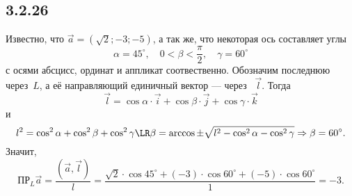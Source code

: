 \subsection{3.2.26}

Известно, что $\vec a=(\sqrt{2};-3;-5)$, а так же, что некоторая ось составляет углы
\[
\alpha=45^\circ,\quad0<\beta<\frac{\pi}{2},\quad\gamma=60^\circ
\]
с осями абсцисс, ординат и аппликат соотвественно. Обозначим последнюю через~$L$, а её направляющий единичный вектор --- через  $\vec l$. Тогда
\[
\vec l=\cos\alpha\cdot\vec i+\cos\beta\cdot\vec j+\cos\gamma\cdot\vec k
\]
и
\[
l^2=\cos^2\alpha+\cos^2\beta+\cos^2\gamma\LR\beta=\arccos\pm\sqrt{l^2-\cos^2\alpha-\cos^2\gamma}\Rightarrow\beta=60^\circ.
\]
Значит,
\[
\text{ПР}_L\vec a=\frac{\left(\vec a,\vec l\right)}{l}=\frac{\sqrt{2}\cdot\cos45^\circ+(-3)\cdot\cos60^\circ+(-5)\cdot\cos60^\circ}{1}=-3.
\]